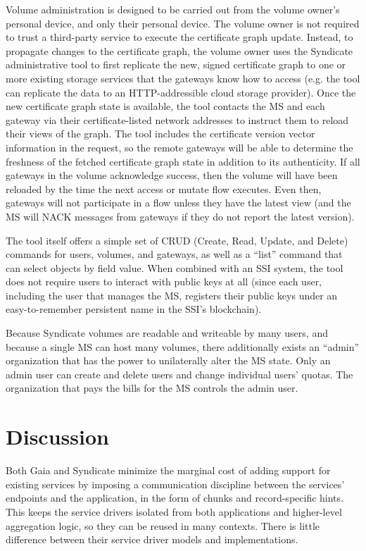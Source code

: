 Volume administration is designed to be carried out from the volume owner's
personal device, and only their personal device.  The volume owner is not
required to trust a third-party service to execute the certificate graph update.
Instead, to propagate changes
to the certificate graph, the volume owner uses the Syndicate
administrative tool to first replicate the new, signed certificate graph to one or more
existing storage services that the gateways know how to access (e.g. the tool
can replicate the data to an HTTP-addressible cloud storage provider).  Once the
new certificate graph state is available, the tool contacts the MS and
each gateway via their certificate-listed network
addresses to instruct them to reload their views of the graph.  The tool includes the
certificate version vector information in the request, so the remote gateways will be able to
determine the freshness of the fetched certificate graph state in addition to
its authenticity.  If all gateways in the volume acknowledge success, then the
volume will have been reloaded by the time the next access or mutate flow
executes.  Even then, gateways will not participate in a flow unless they have
the latest view (and the MS will NACK messages from gateways if they do not
report the latest version).

The tool itself offers a simple set of CRUD (Create, Read, Update,
and Delete) commands for users, volumes, and
gateways, as well as a ``list'' command that can select objects by field value.
When combined with an SSI system, the tool does not require users to interact with
public keys at all (since each user, including the user that manages the MS,
registers their public keys under an easy-to-remember persistent name in the
SSI's blockchain).

Because Syndicate volumes are readable and writeable by many users, and because
a single MS can host many volumes, there additionally exists an ``admin''
organization that has the power to unilaterally alter the MS state.  Only an
admin user can create and delete users and change individual users' quotas.
The organization that pays the bills for the MS controls the admin user.

\section{Discussion}

Both Gaia and Syndicate minimize the marginal cost of adding support for
existing services by imposing a communication discipline between the services'
endpoints and the application, in the form of chunks and record-specific hints.
This keeps the service drivers isolated from both applications and higher-level
aggregation logic, so they can be reused in many contexts.  There is little
difference between their service driver models and implementations.

